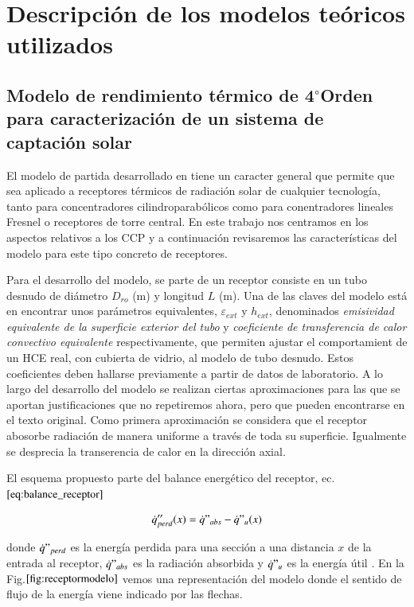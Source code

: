 \chapter{Descripción de los modelos teóricos utilizados}
\label{descripcionmodelos}

\section{Modelo de rendimiento térmico de 4$^{\circ}$Orden para caracterización de un sistema de captación solar}
El modelo de partida desarrollado en \cite{barberofresnoDesarrolloModeloTeorico2018} tiene un caracter general que permite que sea aplicado a receptores térmicos de radiación solar de cualquier tecnología, tanto para concentradores cilindroparabólicos como para conentradores lineales Fresnel o receptores de torre central. En este trabajo nos centramos en los aspectos relativos a los CCP y a continuación revisaremos las características del modelo para este tipo concreto de receptores.

Para el desarrollo del modelo, se parte de un receptor consiste en un tubo desnudo de diámetro \(D_{ro}\) (m) y longitud \(L\) (m). Una de las claves del modelo está en encontrar unos parámetros equivalentes, \(\varepsilon_{ext}\) y \(h_{ext}\),  denominados \textit{emisividad equivalente de la superficie exterior del tubo} y \textit{coeficiente de transferencia de calor convectivo equivalente} respectivamente, que permiten ajustar el comportamient de un HCE real, con cubierta de vidrio, al modelo de tubo desnudo. Estos coeficientes deben hallarse previamente a partir de datos de laboratorio. A lo largo del desarrollo del modelo se realizan ciertas aproximaciones para las que se aportan justificaciones que no repetiremos ahora, pero que pueden encontrarse en el texto original. Como primera aproximación se considera que el receptor abosorbe radiación de manera uniforme a través de toda su superficie. Igualmente se desprecia la transerencia de calor en la dirección axial.

El esquema propuesto parte del balance energético del receptor, ec.\(\eqref{eq:balance_receptor}\)

\begin{equation}
    \dot{q}''_{perd}(x) = \dot{q}"_{abs}-\dot{q}"_{u}(x) \label{eq:balance_receptor}
\end{equation}

donde \(\dot{q}"_{perd}\) es la energía perdida para una sección a una distancia \(x\) de la entrada al receptor, \(\dot{q}"_{abs}\) es la radiación absorbida y \(\dot{q}"_{u}\) es la energía útil . En la Fig.$\ref{fig:receptormodelo}$ vemos una representación del modelo donde el sentido de flujo de la energía viene indicado por las flechas.

